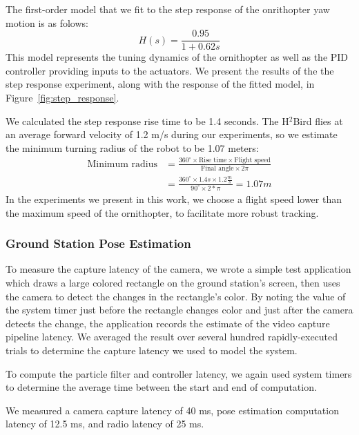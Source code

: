\documentclass{aamas2013}
\begin{document}
The first-order model that we fit to the step response of the onrithopter 
yaw motion is as folows:
\begin{equation}
\label{eq:transfer_func}
H(s) = \frac{0.95}{1+0.62s}
\end{equation}
This model represents the tuning dynamics of the ornithopter as well as the
PID controller providing inputs to the actuators. We present the results of
the the step response experiment, along with the response of the fitted model,
in Figure~\ref{fig:step_response}.

We calculated the step response rise time to be 1.4 seconds. The H$^2$Bird flies at an 
average forward velocity of 1.2 m/s during our experiments, so we estimate 
the minimum turning radius of the robot to be 1.07 meters:
\begin{equation}
\label{eq:min_radius}
\begin{aligned}
\text{Minimum radius} & = \frac{360^{\circ}\times\text{Rise time}\times\text{Flight
speed}}{\text{Final angle}\times 2\pi}\\
& = \frac{360^{\circ}\times 1.4s\times 1.2\frac{m}{s}}{90^{\circ}\times2*\pi} = 1.07 m
\end{aligned}
\end{equation}
In the experiments we present in this work, we choose a flight speed lower 
than the maximum speed of the ornithopter, to facilitate more robust 
tracking.

\subsubsection{Ground Station Pose Estimation}
To measure the capture latency of the camera, we wrote a simple test
application which draws a large colored rectangle on the ground station's
screen, then uses the camera to detect the changes in the rectangle's color.
By noting the value of the system timer just before the rectangle changes
color and just after the camera detects the change, the application records
the estimate of the video capture pipeline latency. We averaged the result
over several hundred rapidly-executed trials to determine the capture latency
we used to model the system.

To compute the particle filter and controller latency, we again used system 
timers to determine the average time between the start and end of computation.

We measured a camera capture latency of 40 ms, pose estimation computation 
latency of 12.5 ms, and radio latency of 25 ms.
\end{document}
